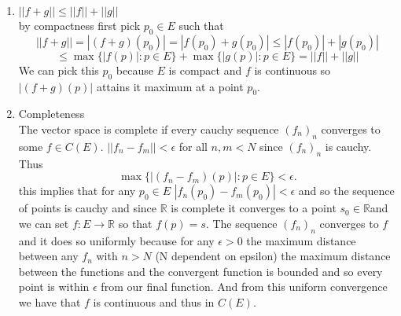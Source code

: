 \documentclass{amsart}
\begin{document}
\begin{enumerate}
        \item $||f + g|| \le ||f|| + ||g||$ \\
        by compactness first pick $p_0\in E$ such that \[
            ||f+g|| = |(f+g)(p_0)| = |f(p_0) + g(p_0)| \le |f(p_0)| + |g(p_0)| 
        \]\[
            \le \max\{|f(p)| : p \in E\} + \max\{|g(p)| : p \in E\} = ||f|| + ||g||
        \]
        We can pick this $p_0$ because $E$ is compact and $f$ is continuous so $|(f+g)(p)|$ attains it maximum at a point $p_0$.
        \item Completeness\\
            The vector space is complete if every cauchy sequence $(f_n)_n$ converges to some $f \in C(E)$.
            $||f_n - f_m|| < \epsilon$ for all $n,m < N$ since $(f_n)_n$ is cauchy. Thus
            \[
                \max\{|(f_n-f_m)(p)| : p \in E\} < \epsilon
            .\] 
            this implies that for any $p_0 \in E$ $|f_n(p_0) - f_m(p_0)| < \epsilon$ and so the sequence of points is cauchy and since $ \mathbb{R} $ is complete
            it converges to a point $s_0 \in \mathbb{R} $and we can set $f : E \rightarrow \mathbb{R}$ so that $f(p) = s$.
            The sequence $(f_n)_n$ converges to $f$ and it does so uniformly because for any $\epsilon > 0$ the maximum distance between any $f_n$ with $n > N $ (N dependent on epsilon)
            the maximum distance between the functions and the convergent function is bounded and so every point is within $\epsilon$ from our final function. 
            And from this uniform convergence we have that $f$ is continuous and thus in $C(E)$.
    \end{enumerate}
\end{document}
